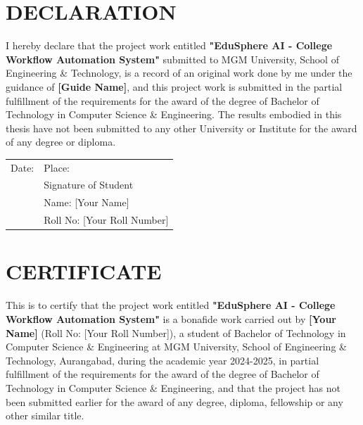 
\chapter*{DECLARATION}

I hereby declare that the project work entitled \textbf{"EduSphere AI - College Workflow Automation System"} submitted to MGM University, School of Engineering \& Technology, is a record of an original work done by me under the guidance of \textbf{[Guide Name]}, and this project work is submitted in the partial fulfillment of the requirements for the award of the degree of Bachelor of Technology in Computer Science \& Engineering. The results embodied in this thesis have not been submitted to any other University or Institute for the award of any degree or diploma.

\vspace{2cm}

\noindent
\begin{tabular}{@{}p{}p{}@{}}
Date: \underline{\hspace{3cm}} & Place: \underline{\hspace{3cm}} \\[2cm]
& Signature of Student\\
& Name: [Your Name]\\
& Roll No: [Your Roll Number]
\end{tabular}

\newpage

\chapter*{CERTIFICATE}

This is to certify that the project work entitled \textbf{"EduSphere AI - College Workflow Automation System"} is a bonafide work carried out by \textbf{[Your Name]} (Roll No: [Your Roll Number]), a student of Bachelor of Technology in Computer Science \& Engineering at MGM University, School of Engineering \& Technology, Aurangabad, during the academic year 2024-2025, in partial fulfillment of the requirements for the award of the degree of Bachelor of Technology in Computer Science \& Engineering, and that the project has not been submitted earlier for the award of any degree, diploma, fellowship or any other similar title.

